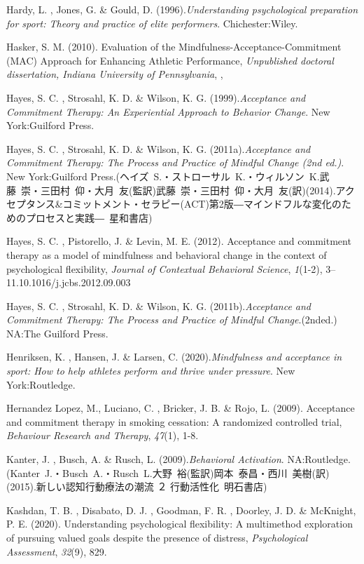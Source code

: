 \documentclass[12pt,a4paper,xelatex,ja=standard]{bxjsarticle}
\begin{document}
Hardy, L. , Jones, G. \& Gould, D.
(1996).\emph{Understanding psychological preparation for sport: Theory and practice of elite performers}.
Chichester:Wiley.

Hasker, S. M. (2010). Evaluation of the
Mindfulness-Acceptance-Commitment (MAC) Approach for Enhancing Athletic
Performance,
\emph{Unpublished doctoral dissertation, Indiana University of Pennsylvania},
,

Hayes, S. C. , Strosahl, K. D. \& Wilson, K. G.
(1999).\emph{Acceptance and Commitment Therapy: An Experiential Approach to Behavior Change}.
New York:Guilford Press.

Hayes, S. C. , Strosahl, K. D. \& Wilson, K. G.
(2011a).\emph{Acceptance and Commitment Therapy: The Process and Practice of Mindful Change (2nd ed.)}.
New York:Guilford
Press.(ヘイズ~S.・ストローサル~K.・ウィルソン~K.武藤~崇・三田村~仰・大月~友(監訳)武藤~崇・三田村~仰・大月~友(訳)(2014).アクセプタンス\&コミットメント・セラピー(ACT)第2版―マインドフルな変化のためのプロセスと実践―~星和書店)

Hayes, S. C. , Pistorello, J. \& Levin, M. E. (2012). Acceptance and
commitment therapy as a model of mindfulness and behavioral change in
the context of psychological flexibility,
\emph{Journal of Contextual Behavioral Science}, \emph{1}(1-2),
3--11.10.1016/j.jcbs.2012.09.003

Hayes, S. C. , Strosahl, K. D. \& Wilson, K. G.
(2011b).\emph{Acceptance and Commitment Therapy: The Process and Practice of Mindful Change}.(2nded.)
NA:The Guilford Press.

Henriksen, K. , Hansen, J. \& Larsen, C.
(2020).\emph{Mindfulness and acceptance in sport: How to help athletes perform and thrive under pressure}.
New York:Routledge.

Hernandez Lopez, M., Luciano, C. , Bricker, J. B. \& Rojo, L. (2009).
Acceptance and commitment therapy in smoking cessation: A randomized
controlled trial, \emph{Behaviour Research and Therapy}, \emph{47}(1),
1-8.

Kanter, J. , Busch, A. \& Rusch, L. (2009).\emph{Behavioral Activation}.
NA:Routledge.(Kanter~J.・Busch~A.・Rusch~L.大野~裕(監訳)岡本~泰昌・西川~美樹(訳)(2015).新しい認知行動療法の潮流
２ 行動活性化~明石書店)

Kashdan, T. B. , Disabato, D. J. , Goodman, F. R. , Doorley, J. D. \&
McKnight, P. E. (2020). Understanding psychological flexibility: A
multimethod exploration of pursuing valued goals despite the presence of
distress, \emph{Psychological Assessment}, \emph{32}(9), 829.
\end{document}
